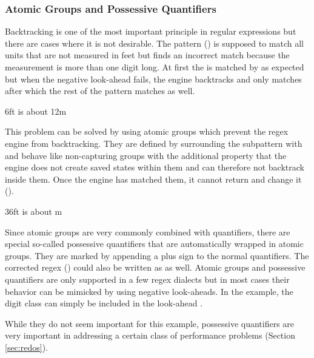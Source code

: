 \subsubsection{Atomic Groups and Possessive Quantifiers}

Backtracking is one of the most important principle in regular expressions but there are cases where it is not desirable. The pattern (\textbf{}) is supposed to match all units that are not measured in feet but finds an incorrect match because the measurement is more than one digit long. At first the  is matched by  as expected but when the negative look-ahead fails, the engine backtracks and only matches  after which the rest of the pattern matches as well.

\begin{listingBoxFigure}[title={Backtracking leads to incorrect Match with \pattern{\bs d+(?!ft)}},label=fig:regexNonPossessive,width=14cm,center]
    6ft is about 12m
\end{listingBoxFigure}

This problem can be solved by using atomic groups which prevent the regex engine from backtracking. They are defined by surrounding the subpattern with  and behave like non-capturing groups with the additional property that the engine does not create saved states within them and can therefore not backtrack inside them. Once the engine has matched them, it cannot return and change it ().

\begin{listingBoxFigure}[title={Atomic Groups \pattern{(?>\bs d+)(?!ft)} prevent Backtracking},label=fig:regexPossessive,width=14cm,center]
    36ft is about m
\end{listingBoxFigure}

Since atomic groups are very commonly combined with quantifiers, there are special so-called possessive quantifiers that are automatically wrapped in atomic groups. They are marked by appending a plus sign to the normal quantifiers. The corrected regex () could also be written as  as well. Atomic groups and possessive quantifiers are only supported in a few regex dialects but in most cases their behavior can be mimicked by using negative look-aheads. In the example, the digit class can simply be included in the look-ahead .

While they do not seem important for this example, possessive quantifiers are very important in addressing a certain class of performance problems (Section \ref{sec:redos}).
